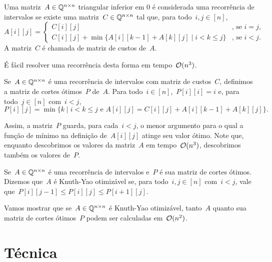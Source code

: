 \begin{defi} \label{ KY:recint }
Uma matriz~$A \in \mathbb{Q}^{n \times n}$ triangular inferior em 0 é considerada uma recorrência de intervalos se existe uma matriz~$C \in \mathbb{Q}^{n \times n}$ tal que, para todo~$i,j \in [n]$,
\begin{equation*}
A[i][j] = \begin{cases}
C[i][j]                                                           & \text{, se } i = j \text{, }  \\
C[i][j] + \min\{A[i][k-1] + A[k][j] \mid i < k \leq j \}          & \text{, se } i < j \text{.}
\end{cases}
\end{equation*}
A matriz~$C$ é chamada de matriz de custos de~$A$.
\end{defi}

É fácil resolver uma recorrência desta forma em tempo~$\mathcal{O}(n^3)$. 

\begin{defi}
Se~$A \in \mathbb{Q}^{n \times n}$ é uma recorrência de intervalos com matriz de custos~$C$, definimos a matriz de cortes ótimos~$P$ de~$A$. Para todo~$i \in [n]$,~$P[i][i] = i$ e, para todo~$j \in [n]$ com~$i < j$, 
$$P[i][j] = \min\{k \mid i < k \leq j \text{ e } A[i][j] = C[i][j] + A[i][k-1] + A[k][j]\} \text{.}$$
\end{defi}

Assim, a matriz~$P$ guarda, para cada~$i < j$, o menor argumento para o qual a função de mínimo na definição de~$A[i][j]$ atinge seu valor ótimo. Note que, enquanto descobrimos os valores da matriz~$A$ em tempo~$\mathcal{O}(n^3)$, descobrimos também os valores de~$P$.

\begin{defi}
Se~$A \in \mathbb{Q}^{n \times n}$ é uma recorrência de intervalos e~$P$ é sua matriz de cortes ótimos. Dizemos que~$A$ é Knuth-Yao otimizável se, para todo~$i,j \in [n]$ com~$i < j$, vale que~${P[i][j-1] \leq P[i][j] \leq P[i+1][j]}$.
\end{defi}

Vamos mostrar que se~$A \in \mathbb{Q}^{n \times n}$ é Knuth-Yao otimizável, tanto~$A$ quanto sua matriz de cortes ótimos~$P$ podem ser calculadas em~$\mathcal{O}(n^2)$.


\section{Técnica}

